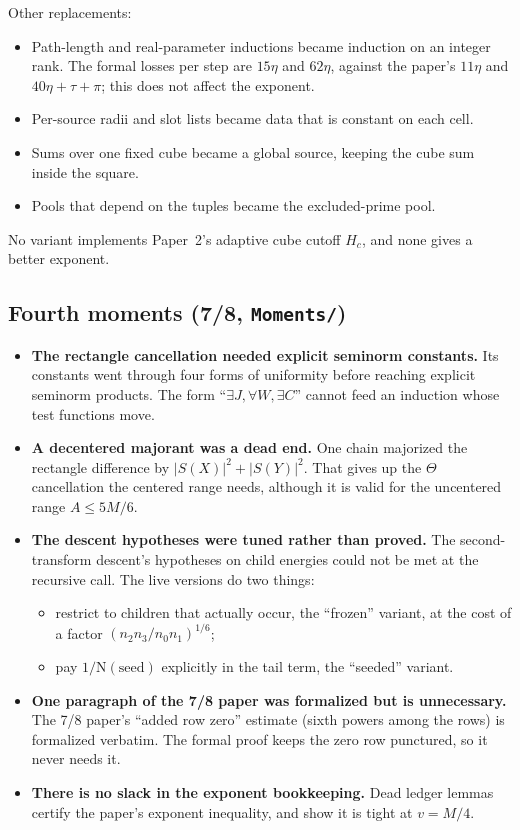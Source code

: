 \documentclass[11pt,a4paper]{article}
\newcommand{\lean}[1]{\nolinkurl{#1}}
\newcommand{\NK}{\mathrm N}
\begin{document}
Other replacements:
\begin{itemize}
\item Path-length and real-parameter inductions became induction on an integer rank. The formal
losses per step are $15\eta$ and $62\eta$, against the paper's $11\eta$ and $40\eta+\tau+\pi$; this
does not affect the exponent.
\item Per-source radii and slot lists became data that is constant on each cell.
\item Sums over one fixed cube became a global source, keeping the cube sum inside the square.
\item Pools that depend on the tuples became the excluded-prime pool.
\end{itemize}

No variant implements Paper~2's adaptive cube cutoff $H_c$, and none gives a better exponent.

\subsection{Fourth moments (7/8, \texorpdfstring{\lean{Moments/}}{Moments/})}
\begin{itemize}
\item \textbf{The rectangle cancellation needed explicit seminorm constants.} Its constants went
through four forms of uniformity before reaching explicit seminorm products. The form ``$\exists J,
\forall W, \exists C$'' cannot feed an induction whose test functions move.
\item \textbf{A decentered majorant was a dead end.} One chain majorized the rectangle difference by
$|S(X)|^2+|S(Y)|^2$. That gives up the $\Theta$ cancellation the centered range needs, although it
is valid for the uncentered range $A\le5M/6$.
\item \textbf{The descent hypotheses were tuned rather than proved.} The second-transform descent's
hypotheses on child energies could not be met at the recursive call. The live versions do two
things:
\begin{itemize}
\item restrict to children that actually occur, the ``frozen'' variant, at the cost of a factor
$(n_2n_3/n_0n_1)^{1/6}$;
\item pay $1/\NK(\mathrm{seed})$ explicitly in the tail term, the ``seeded'' variant.
\end{itemize}
\item \textbf{One paragraph of the 7/8 paper was formalized but is unnecessary.} The 7/8 paper's
``added row zero'' estimate (sixth powers among the rows) is formalized verbatim. The formal proof
keeps the zero row punctured, so it never needs it.
\item \textbf{There is no slack in the exponent bookkeeping.} Dead ledger lemmas certify the paper's
exponent inequality, and show it is tight at $v=M/4$.
\end{itemize}
\end{document}
